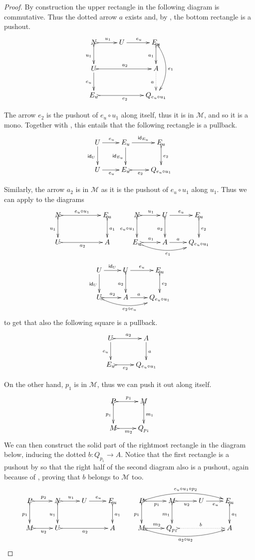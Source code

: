 \begin{proof}
	By construction the upper rectangle in the following diagram is commutative. Thus the dotted arrow $a$ exists and, by , the bottom rectangle is a pushout.
	\[\xymatrix{N \ar@{>->}[r]^{u_1} \ar@{>->}[d]_{u_1} & U \ar[r]^{e_u} & E_u \ar@{>->}[d]_{a_1} \ar@{>->}@/^.5cm/[dd]^{e_1} \\
		U \ar[d]_{e_u} \ar@{>->}[rr]^{a_2}&& A \ar@{.>}[d]_{a} \\ E_u \ar@{>->}[rr]_{e_2}&&Q_{e_u\circ u_1}}\]

	
	The arrow $e_2$ is the pushout of $e_u\circ u_1$ along itself, thus it is in $\mathcal{M}$, and so it is a mono. Together with , this entails that the following rectangle is a pullback.
	\[\xymatrix{U \ar[r]^{e_u}  \ar[d]_{\id{U}}& E_u \ar[r]^-{\id{E_u}} \ar[d]_{\id{E_u}} & E_u \ar@{>->}[d]^{e_2}\\ U \ar[r]_{e_u} & E_u \ar@{>->}[r]_-{e_2} & Q_{e_u\circ u_1}}\]
	
	Similarly, the arrow $a_2$ is in $\mathcal{M}$ as it is the pushout of $e_u\circ u_1$ along $u_1$. Thus we can apply  to the diagrams
	\[\xymatrix{ N \ar@{>->}[rr]^-{e_u\circ u_1} \ar@{>->}[d]_{ u_1} && E_u \ar@{>->}[d]^{a_1} & N \ar@{>->}[d]_{e_u\circ u_1} \ar@{>->}[r]^{u_1} & U \ar@{>->}[d]_{a_2}\ar[r]^-{e_u} & E_u  \ar@{>->}[d]^{e_2}\\ U \ar@{>->}[rr]_{a_2}&& A & E_u \ar@{>->}@/_.4cm/[rr]_{e_1} \ar@{>->}[r]^{a_1} &  A \ar[r]^-{a} & Q_{e_u\circ u_1} }\]
	\[\xymatrix{U  \ar[r]^{\id{U}} \ar[d]_{\id{U}}& U \ar@{>->}[d]_{a_2} \ar[r]^-{e_u} & E_u \ar@{>->}[d]^{e_2} \\U \ar@{>->}[r]^{a_2} \ar@{>->}@/_.4cm/[rr]_{e_2\circ e_u} & A \ar[r]^-{a} & Q_{e_u\circ u_1}}\]
	to get that also the following square is a pullback.
	\[\xymatrix{
		U \ar[d]_{e_u} \ar@{>->}[r]^-{a_2}& A \ar[d]^{a} \\ E_u \ar@{>->}[r]_-{e_2}&Q_{e_u\circ u_1}}\]
	
	On the other hand,  $p_1$ is in $\mathcal{M}$, thus we can push it out along itself.
	\[\xymatrix{P \ar@{>->}[r]^{p_1} \ar@{>->}[d]_{p_1}& M \ar@{>->}[d]^{m_1} \\ M \ar@{>->}[r]_{m_2} & Q_{p_1}}\]
	We can then construct the solid part of the rightmost rectangle in the diagram below, inducing the dotted $b\colon Q_{p_1}\to A$. Notice that the first rectangle is a pushout by  so that  the right half of the second diagram also is a pushout, again because of , proving that $b$ belongs to $\mathcal{M}$ too.
	\[\xymatrix{P \ar@{>->}[r]^{p_2} \ar@{>->}[d]_{p_1}& N \ar@{>->}[d]_{u_1} \ar@{>->}[r]^{u_1}& U \ar[r]^{e_u} & E_u \ar@{>->}[d]^{a_1} & P \ar@{>->}@/^.4cm/[rrr]^{e_u\circ u_1\circ p_2}\ar@{>->}[r]_{p_1} \ar@{>->}[d]_{p_1}& M \ar@{>->}[d]_{m_1} \ar@{>->}[r]_{u_2}& U \ar[r]_{e_u}& E_u \ar@{>->}[d]^{a_1}\\ M \ar@{>->}[r]_{u_2}& U \ar@{>->}[rr]_{a_2}&& A& M \ar@{>->}@/_.4cm/[rrr]_{a_2\circ u_2}\ar@{>->}[r]^{m_2} & Q_{p_1} \ar@{>.>}[rr]^{b} && A}\]
	

\end{proof}
